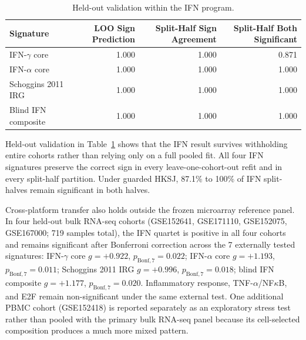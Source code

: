 \documentclass[10pt]{article}
\begin{document}
\begin{table}[H]
\centering
\footnotesize
\setlength{\tabcolsep}{6pt}
\begin{tabular}{lrrr}
\toprule
Signature & LOO Sign Prediction & Split-Half Sign Agreement & Split-Half Both Significant \\
\midrule
IFN-$\gamma$ core & 1.000 & 1.000 & 0.871 \\
IFN-$\alpha$ core & 1.000 & 1.000 & 1.000 \\
Schoggins 2011 IRG & 1.000 & 1.000 & 1.000 \\
Blind IFN composite & 1.000 & 1.000 & 1.000 \\
\bottomrule
\end{tabular}
\caption{Held-out validation within the IFN program.}
\label{tab:heldout}
\end{table}

Held-out validation in Table~\ref{tab:heldout} shows that the IFN result survives withholding entire cohorts rather than relying only on a full pooled fit. All four IFN signatures preserve the correct sign in every leave-one-cohort-out refit and in every split-half partition. Under guarded HKSJ, 87.1\% to 100\% of IFN split-halves remain significant in both halves.

Cross-platform transfer also holds outside the frozen microarray reference panel. In four held-out bulk RNA-seq cohorts (GSE152641, GSE171110, GSE152075, GSE167000; 719 samples total), the IFN quartet is positive in all four cohorts and remains significant after Bonferroni correction across the 7 externally tested signatures: IFN-$\gamma$ core $g=+0.922$, $p_{\mathrm{Bonf},7}=0.022$; IFN-$\alpha$ core $g=+1.193$, $p_{\mathrm{Bonf},7}=0.011$; Schoggins 2011 IRG $g=+0.996$, $p_{\mathrm{Bonf},7}=0.018$; blind IFN composite $g=+1.177$, $p_{\mathrm{Bonf},7}=0.020$. Inflammatory response, TNF-$\alpha$/NF$\kappa$B, and E2F remain non-significant under the same external test. One additional PBMC cohort (GSE152418) is reported separately as an exploratory stress test rather than pooled with the primary bulk RNA-seq panel because its cell-selected composition produces a much more mixed pattern.
\end{document}
